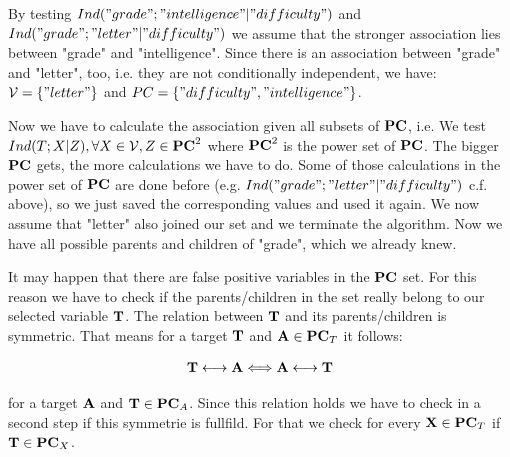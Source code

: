 			 \label{img.firstSelected}

			By testing $Ind("grade"; "intelligence" | "difficulty")$ and $Ind("grade"; "letter" | "difficulty")$ we assume that the stronger association lies between "grade" and "intelligence". Since there is an association between "grade" and "letter", too, i.e. they are not conditionally independent, we have: $\mathcal{V} = \{"letter"\}$ and $PC = \{"difficulty", "intelligence"\}$.

			 \label{img.secondSelected}

			Now we have to calculate the association given all subsets of ${\textbf{PC}}$, i.e. We test $Ind(T; X | Z), \forall X \in \mathcal{V}, Z \in {\textbf{PC}}^{2}$ where ${\textbf{PC}}^{2}$ is the power set of ${\textbf{PC}}$. The bigger ${\textbf{PC}}$ gets, the more calculations we have to do. Some of those calculations in the power set of ${\textbf{PC}}$ are done before (e.g. $Ind("grade"; "letter" | "difficulty")$ c.f. above), so we just saved the corresponding values and used it again. We now assume that "letter" also joined our set and we terminate the algorithm. Now we have all possible parents and children of "grade", which we already knew.

			 \label{img.thirdSelected}

			It may happen that there are false positive variables in the ${\textbf{PC}}$ set. For this reason we have to check if the parents/children in the set really belong to our selected variable ${\textbf{T}}$. The relation between ${\textbf{T}}$ and its parents/children is symmetric. That means for a target ${\textbf{T}}$ and ${\textbf{A}} \in {\textbf{PC}}_{T}$ it follows:

			\begin{equation}
				{\textbf{T}} \longleftrightarrow {\textbf{A}} \Longleftrightarrow {\textbf{A}} \longleftrightarrow {\textbf{T}} \label{eq.symmetric}
			\end{equation}

			for a target ${\textbf{A}}$ and ${\textbf{T}} \in {\textbf{PC}}_{A}$. Since this relation holds we have to check in a second step if this symmetrie is fullfild. For that we check for every ${\textbf{X}} \in {\textbf{PC}}_{T}$ if ${\textbf{T}} \in {\textbf{PC}}_{X}$.\\

